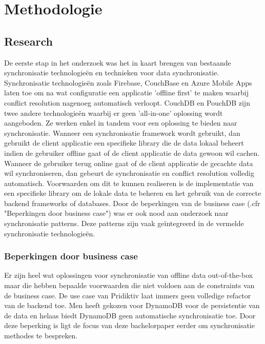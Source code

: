 
\chapter{Methodologie}
\label{ch:methodologie}


\section{Research}
De eerste stap in het onderzoek was het in kaart brengen van bestaande synchronisatie technologie\"en en technieken voor data synchronisatie. Synchronisatie technologie\"en zoals Firebase, CouchBase en Azure Mobile Apps laten toe om na wat configuratie een applicatie 'offline first' te maken waarbij conflict resolution nagenoeg automatisch verloopt. CouchDB en PouchDB zijn twee andere technologie\"en waarbij er geen 'all-in-one' oplossing wordt aangeboden. Ze werken enkel in tandem voor een oplossing te bieden naar synchronisatie. Wanneer een synchronisatie framework wordt gebruikt, dan gebruikt de client applicatie een specifieke library die de data lokaal beheert indien de gebruiker offline gaat of de client applicatie de data gewoon wil cachen. Wanneer de gebruiker terug online gaat of de client applicatie de gecachte data wil synchroniseren, dan gebeurt de synchronisatie en conflict resolution volledig automatisch. Voorwaarden om dit te kunnen realiseren is de implementatie van een specifieke library om de lokale data te beheren en het gebruik van de correcte backend frameworks of databases.
Door de beperkingen van de business case (.cfr "Beperkingen door business case") was er ook nood aan onderzoek naar synchronisatie patterns. Deze patterns zijn vaak ge\"integreerd in de vermelde synchronisatie technologie\"en.
\subsection{Beperkingen door business case}
Er zijn heel wat oplossingen voor synchronisatie van offline data out-of-the-box maar die hebben bepaalde voorwaarden die niet voldoen aan de constraints van de business case. De use case van Pridiktiv laat immers geen volledige refactor van de backend toe. Men heeft gekozen voor DynamoDB voor de persistentie van de data en helaas biedt DynamoDB geen automatische synchronisatie toe. Door deze beperking is ligt de focus van deze bachelorpaper eerder om synchronisatie methodes te bespreken.
